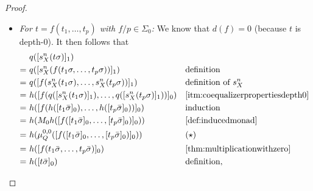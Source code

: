 \documentclass[11pt,a4paper]{amsart}
\newcommand{\sigp}{\Sigma_0}
\theoremstyle{plain}
\newcommand{\id}{\mathit{id}}
\numberwithin{equation}{section}
\newcommand{\+}[1]{\mathcal{#1}\xspace}
\theoremstyle{definition}
\begin{document}
\begin{proof}
\begin{enumerate}[wide]
\begin{itemize}
                    \textit{For \(t = x\) with \(x \in Y\):}
                    \begin{align*}
                        &q([s^n_X(t\sigma)]_1) \\
                        =~&q(\llbracket [s^n_X(t\sigma)]_1 \rrbracket^\id_0) && \text{definition} \\
                        =~&q(\mu^{0, 1}_{M_n X}([[s^n_X(t\sigma)]_1]_0)) && \text{\cref{def:inducedmonad}} \\
                        =~&h(M_0 q([[s^n_X(t\sigma)]_1]_0)) && \text{\cref{eq:m0algebramorphism}} \\
                        =~&h([q([s^n_X(\sigma(x))]_1)]_0) && \text{\cref{def:inducedmonad}} \\
                        =~&h([\bar{\sigma}(x)]_0) && \text{definition of } \bar{\sigma} \\
                        =~&h([t\bar{\sigma}]_0) && \text{definition}.
                    \end{align*}
                \item
                    \textit{For \(t = f(t_1, \ldots, t_p)\) with \(f/p \in \sigp\):}
                    We know that \(d(f) = 0\) (because \(t\) is depth-0). It then follows that
                    \begin{align*}
                        &q([s^n_X(t\sigma)]_1) \\
                        =~&q([s^n_X(f(t_1\sigma, \ldots, t_p\sigma))]_1) && \text{definition} \\
                        =~&q([f(s^n_X(t_1\sigma), \ldots, s^n_X(t_p\sigma))]_1) && \text{definition of } s^n_X \\
                        =~&h([f(q([s^n_X(t_1\sigma)]_1), \ldots, q([s^n_X(t_p\sigma)]_1))]_0) && \text{\eqref{itm:coequalizerpropertiesdepth0}} \\
                        =~&h([f(h([t_1\bar{\sigma}]_0), \ldots, h([t_p\bar{\sigma}]_0))]_0) && \text{induction} \\
                        =~&h(M_0 h([f([t_1\bar{\sigma}]_0, \ldots, [t_p\bar{\sigma}]_0)]_0)) && \text{\cref{def:inducedmonad}} \\
                        =~&h(\mu^{0, 0}_{Q}([f([t_1\bar{\sigma}]_0, \ldots, [t_p\bar{\sigma}]_0)]_0)) && (\star) \\
                        =~&h([f(t_1\bar{\sigma}, \ldots, t_p\bar{\sigma})]_0) && \text{\cref{thm:multiplicationwithzero}} \\
                        =~&h([t\bar{\sigma}]_0) && \text{definition},

\end{align*}
\end{itemize}
\end{enumerate}
\end{proof}
\end{document}
